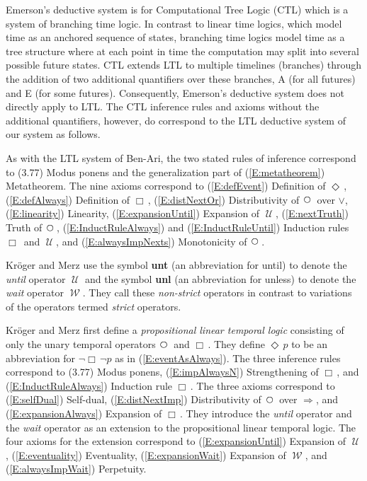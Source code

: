 \documentclass[12pt, fleqn, leqno]{article}
\newcommand{\impl}{\ensuremath{\Rightarrow}}        %
\newcommand{\Until}{\;\mathcal{U}\;}
\newcommand{\Wait}{\;\mathcal{W}\;}
\newcommand{\Next}{\;\,\text{\raisebox{3.5pt}{\circle{6}}}}
\newcommand{\Event}{\Diamond\,}
\newcommand{\Always}{\Box\,}
\begin{document}
Emerson's deductive system is for Computational Tree Logic (CTL) which is a system of branching time logic.
In contrast to linear time logics, which model time as an anchored sequence of states, branching time logics model time as a tree structure where at each point in time the computation may split into several possible future states.
CTL extends LTL to multiple timelines (branches) through the addition of two additional quantifiers over these branches, A (for all futures) and E (for some futures).
Consequently, Emerson's deductive system does not directly apply to LTL.
The CTL inference rules and axioms without the additional quantifiers, however, do correspond to the LTL deductive system of our system as follows. 

As with the LTL system of Ben-Ari, the two stated rules of inference correspond to (3.77) Modus ponens and the generalization part of (\ref{E:metatheorem}) Metatheorem.
The nine axioms correspond to (\ref{E:defEvent}) Definition of $\Event$, (\ref{E:defAlways}) Definition of $\Always$, (\ref{E:distNextOr}) Distributivity of $\Next$ over $\lor$, (\ref{E:linearity}) Linearity, (\ref{E:expansionUntil}) Expansion of $\Until$, (\ref{E:nextTruth}) Truth of $\Next$, (\ref{E:InductRuleAlways}) and (\ref{E:InductRuleUntil}) Induction rules $\Always$ and $\Until$, and (\ref{E:alwaysImpNexts}) Monotonicity of $\Next$.

Kröger and Merz \cite{Kroger} use the symbol \textbf{unt} (an abbreviation for until) to denote the  \textit{until} operator $\Until$ and the symbol \textbf{unl} (an abbreviation for unless) to denote the \textit{wait} operator $\Wait$.
They call these \textit{non-strict} operators in contrast to variations of the operators termed \textit{strict} operators.

Kröger and Merz first define a \textit{propositional linear temporal logic} consisting of only the unary temporal operators $\Next$ and $\Always$.
They define $\Event p$ to be an abbreviation for $\neg\Always\neg p$ as in (\ref{E:eventAsAlways}).
The three inference rules correspond to (3.77) Modus ponens, (\ref{E:impAlwaysN}) Strengthening of $\Always$, and (\ref{E:InductRuleAlways}) Induction rule $\Always$.
The three axioms correspond to (\ref{E:selfDual}) Self-dual, (\ref{E:distNextImp}) Distributivity of $\Next$ over $\impl$, and (\ref{E:expansionAlways}) Expansion of $\Always$.
They introduce the \textit{until} operator and the \textit{wait} operator as an extension to the propositional linear temporal logic.
The four axioms for the extension correspond to (\ref{E:expansionUntil}) Expansion of $\Until$, (\ref{E:eventuality}) Eventuality, (\ref{E:expansionWait}) Expansion of $\Wait$, and (\ref{E:alwaysImpWait}) Perpetuity.
\end{document}
